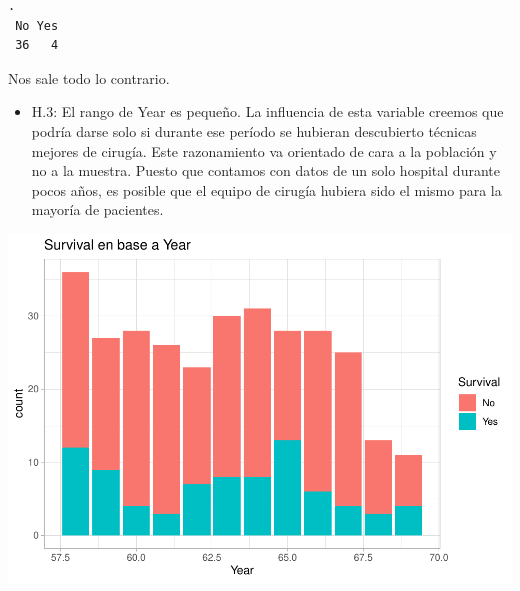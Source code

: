 \documentclass[
]{article}
\newenvironment{Shaded}{\begin{snugshade}}{\end{snugshade}}
\newcommand{\DataTypeTok}[1]{\textcolor[rgb]{0.13,0.29,0.53}{#1}}
\newcommand{\KeywordTok}[1]{\textcolor[rgb]{0.13,0.29,0.53}{\textbf{#1}}}
\newcommand{\NormalTok}[1]{#1}
\newcommand{\OperatorTok}[1]{\textcolor[rgb]{0.81,0.36,0.00}{\textbf{#1}}}
\newcommand{\StringTok}[1]{\textcolor[rgb]{0.31,0.60,0.02}{#1}}
\providecommand{\tightlist}{%
  \setlength{\itemsep}{0pt}\setlength{\parskip}{0pt}}
\begin{document}
\begin{verbatim}
.
 No Yes 
 36   4 
\end{verbatim}

Nos sale todo lo contrario.

\begin{itemize}
\tightlist
\item
  H.3: El rango de Year es pequeño. La influencia de esta variable
  creemos que podría darse solo si durante ese período se hubieran
  descubierto técnicas mejores de cirugía. Este razonamiento va
  orientado de cara a la población y no a la muestra. Puesto que
  contamos con datos de un solo hospital durante pocos años, es posible
  que el equipo de cirugía hubiera sido el mismo para la mayoría de
  pacientes.
\end{itemize}

\begin{Shaded}
\end{Shaded}

\begin{center}\includegraphics{EDA2_files/figure-latex/unnamed-chunk-35-1} \end{center}
\end{document}
